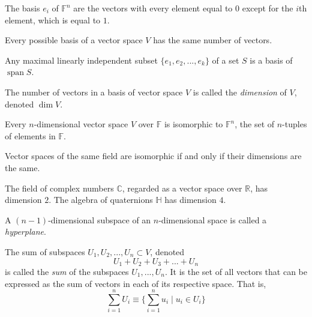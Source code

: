 \documentclass{article}
\DeclareMathOperator{\Span}{span}
\begin{document}
    \begin{example}
      The basis $e_i$ of $\mathbb{F}^n$ are the vectors with every element equal to $0$ except for the $i$th element, which is equal to $1$. 
    \end{example}

    \begin{proposition}
      Every possible basis of a vector space $V$ has the same number of vectors.
    \end{proposition}

    \begin{proposition}
      Any maximal linearly independent subset $\{ e_1, e_2, ..., e_k\}$ of a set $S$ is a basis of $\Span S$. 
    \end{proposition}

    \begin{definition}[Dimension]
      The number of vectors in a basis of vector space $V$ is called the \textit{dimension} of $V$, denoted $\dim{V}$. 
    \end{definition}

    \begin{theorem}
      Every $n$-dimensional vector space $V$ over $\mathbb{F}$ is isomorphic to $\mathbb{F}^n$, the set of $n$-tuples of elements in $\mathbb{F}$. 
    \end{theorem}

    \begin{corollary}
      Vector spaces of the same field are isomorphic if and only if their dimensions are the same. 
    \end{corollary}

    \begin{example}
      The field of complex numbers $\mathbb{C}$, regarded as a vector space over $\mathbb{R}$, has dimension $2$. The algebra of quaternions $\mathbb{H}$ has dimension $4$. 
    \end{example}

    \begin{definition}[Hyperplane]
      A $(n - 1)$-dimensional subspace of an $n$-dimensional space is called a \textit{hyperplane}. 
    \end{definition}

    \begin{definition}
      The sum of subspaces $U_1, U_2, ..., U_n \subset V$, denoted
      \begin{equation}
        U_1 + U_2 + U_3 + ... + U_n
      \end{equation}
      is called the \textit{sum} of the subspaces $U_1, ..., U_n$. It is the set of all vectors that can be expressed as the sum of vectors in each of its respective space. That is, 
      \begin{equation}
        \sum_{i=1}^n U_i \equiv \Big\{ \sum_{i = 1}^n u_i \;|\; u_i \in U_i\Big\}
      \end{equation}
    \end{definition}
\end{document}
